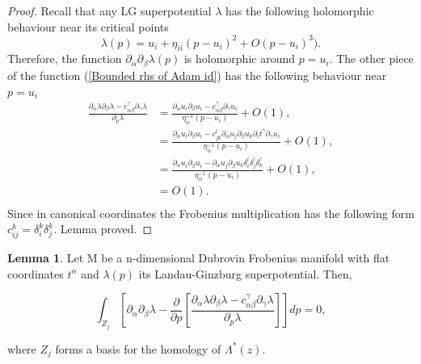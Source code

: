 \documentclass{article}
\theoremstyle{definition}
\newtheorem{lemma}[theorem]{Lemma}
\begin{document}
\begin{proof}
Recall that any LG superpotential $\lambda$ has the following holomorphic behaviour near its critical points
\begin{equation}
\lambda(p)=u_i+\eta_{ii}(p-u_i)^2+O(p-u_i)^3).
\end{equation}
Therefore, the function $\partial_{\alpha}\partial_{\beta}\lambda(p)$ is holomorphic around $p=u_i$. The other piece of the function (\ref{Bounded rhs of Adam id}) has the following behaviour near $p=u_i$
 \begin{equation}\label{Bounded rhs of Adam id 10}
 \begin{split}
\frac{ \partial_{\alpha}\lambda \partial_{\beta}\lambda-c_{\alpha\beta}^{\gamma}\partial_{\gamma}\lambda}{ \partial_{p}\lambda}&=  \frac{ \partial_{\alpha}u_i \partial_{\beta}u_i-c_{\alpha\beta}^{\gamma}\partial_{\gamma}u_i}{ \eta^{-1}_{ii}(p-u_i)}+ O(1),\\
&=  \frac{ \partial_{\alpha}u_i \partial_{\beta}u_i-c_{jk}^{l}\partial_{\alpha}u_j\partial_{\beta}u_k\partial_{i}t^{\gamma}\partial_{\gamma}u_i}{ \eta^{-1}_{ii}(p-u_i)}+ O(1),\\
&=  \frac{ \partial_{\alpha}u_i \partial_{\beta}u_i-\partial_{\alpha}u_j\partial_{\beta}u_k\delta_i^l\delta_{j}^{l}\delta_{k}^l}{ \eta^{-1}_{ii}(p-u_i)}+ O(1),\\
&= O(1).\\
\end{split}
\end{equation}
Since in canonical coordinates the Frobenius multiplication has the following form $c_{ij}^k=\delta_i^k\delta_j^k$. Lemma proved.

\end{proof}


\begin{lemma}
Let M be a n-dimensional Dubrovin Frobenius manifold with flat coordinates $t^{\alpha}$  and $\lambda(p)$ its Landau-Ginzburg superpotential. Then,
 
 \begin{equation}\label{second derivative of Hodge variation integral version}
\int_{Z_j}\left[\partial_{\alpha}\partial_{\beta}\lambda-\frac{\partial}{\partial p}\left[ \frac{ \partial_{\alpha}\lambda \partial_{\beta}\lambda-c_{\alpha\beta}^{\gamma}\partial_{\gamma}\lambda}{ \partial_{p}\lambda}  \right]\right] dp=0,
\end{equation}

where $Z_j$ forms a basis for the homology of $\Lambda^{*}(z)$.
\end{lemma}
\end{document}
